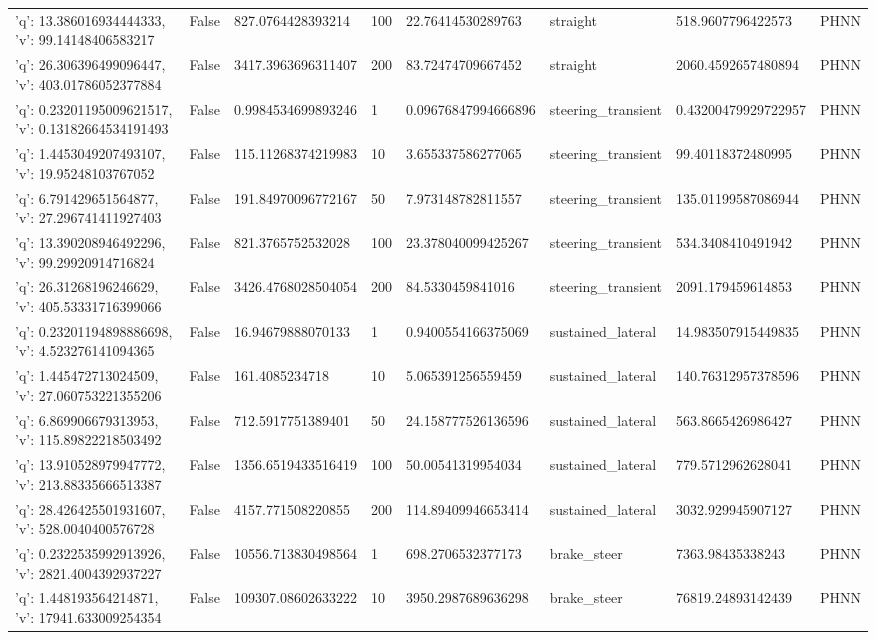 \begin{tabular}{llllllll}
{'q': 13.386016934444333, 'v': 99.14148406583217} & False & 827.0764428393214 & 100 & 22.76414530289763 & straight & 518.9607796422573 & PHNN \\
{'q': 26.306396499096447, 'v': 403.01786052377884} & False & 3417.3963696311407 & 200 & 83.72474709667452 & straight & 2060.4592657480894 & PHNN \\
{'q': 0.23201195009621517, 'v': 0.13182664534191493} & False & 0.9984534699893246 & 1 & 0.09676847994666896 & steering\_transient & 0.43200479929722957 & PHNN \\
{'q': 1.4453049207493107, 'v': 19.95248103767052} & False & 115.11268374219983 & 10 & 3.655337586277065 & steering\_transient & 99.40118372480995 & PHNN \\
{'q': 6.791429651564877, 'v': 27.296741411927403} & False & 191.84970096772167 & 50 & 7.973148782811557 & steering\_transient & 135.01199587086944 & PHNN \\
{'q': 13.390208946492296, 'v': 99.29920914716824} & False & 821.3765752532028 & 100 & 23.378040099425267 & steering\_transient & 534.3408410491942 & PHNN \\
{'q': 26.31268196246629, 'v': 405.53331716399066} & False & 3426.4768028504054 & 200 & 84.5330459841016 & steering\_transient & 2091.179459614853 & PHNN \\
{'q': 0.23201194898886698, 'v': 4.523276141094365} & False & 16.94679888070133 & 1 & 0.9400554166375069 & sustained\_lateral & 14.983507915449835 & PHNN \\
{'q': 1.445472713024509, 'v': 27.060753221355206} & False & 161.4085234718 & 10 & 5.065391256559459 & sustained\_lateral & 140.76312957378596 & PHNN \\
{'q': 6.869906679313953, 'v': 115.89822218503492} & False & 712.5917751389401 & 50 & 24.158777526136596 & sustained\_lateral & 563.8665426986427 & PHNN \\
{'q': 13.910528979947772, 'v': 213.88335666513387} & False & 1356.6519433516419 & 100 & 50.00541319954034 & sustained\_lateral & 779.5712962628041 & PHNN \\
{'q': 28.426425501931607, 'v': 528.0040400576728} & False & 4157.771508220855 & 200 & 114.89409946653414 & sustained\_lateral & 3032.929945907127 & PHNN \\
{'q': 0.2322535992913926, 'v': 2821.4004392937227} & False & 10556.713830498564 & 1 & 698.2706532377173 & brake\_steer & 7363.98435338243 & PHNN \\
{'q': 1.448193564214871, 'v': 17941.633009254354} & False & 109307.08602633222 & 10 & 3950.2987689636298 & brake\_steer & 76819.24893142439 & PHNN \\

\end{tabular}
